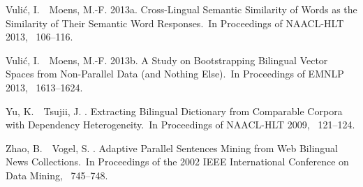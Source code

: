 \documentclass[english]{jnlp_1.4}
\begin{document}
\begin{thebibliography}{}
Vuli{\'{c}}, I.\BBACOMMA\ \BBA\ Moens, M.-F. \BBOP 2013a\BBCP.
\newblock \BBOQ Cross-Lingual Semantic Similarity of Words as the Similarity of
  Their Semantic Word Responses.\BBCQ\
\newblock In {\Bem Proceedings of NAACL-HLT 2013}, \mbox{\BPGS\ 106--116}.

Vuli{\'{c}}, I.\BBACOMMA\ \BBA\ Moens, M.-F. \BBOP 2013b\BBCP.
\newblock \BBOQ A Study on Bootstrapping Bilingual Vector Spaces from
  Non-Parallel Data (and Nothing Else).\BBCQ\
\newblock In {\Bem Proceedings of EMNLP 2013}, \mbox{\BPGS\ 1613--1624}.

Yu, K.\BBACOMMA\ \BBA\ Tsujii, J. \BBOP 2009\BBCP.
\newblock \BBOQ Extracting Bilingual Dictionary from Comparable Corpora with
  Dependency Heterogeneity.\BBCQ\
\newblock In {\Bem Proceedings of NAACL-HLT 2009}, \mbox{\BPGS\ 121--124}.

Zhao, B.\BBACOMMA\ \BBA\ Vogel, S. \BBOP 2002\BBCP.
\newblock \BBOQ Adaptive Parallel Sentences Mining from Web Bilingual News
  Collections.\BBCQ\
\newblock In {\Bem Proceedings of the 2002 IEEE International Conference on
  Data Mining}, \mbox{\BPGS\ 745--748}.

\end{thebibliography}
\end{document}

